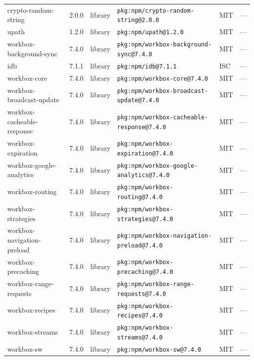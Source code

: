 \documentclass[11pt,a4paper]{article}
\begin{document}
\begin{longtable}{|p{4cm}|p{2cm}|p{1.6cm}|p{5cm}|p{1.5cm}|p{3.5cm}|}
\raggedright crypto-random-string & 2.0.0 & library & \small\texttt{pkg:npm/crypto-random-string@2.0.0} & MIT & \small — \\
\raggedright upath & 1.2.0 & library & \small\texttt{pkg:npm/upath@1.2.0} & MIT & \small — \\
\raggedright workbox-background-sync & 7.4.0 & library & \small\texttt{pkg:npm/workbox-background-sync@7.4.0} & MIT & \small — \\
\raggedright idb & 7.1.1 & library & \small\texttt{pkg:npm/idb@7.1.1} & ISC & \small — \\
\raggedright workbox-core & 7.4.0 & library & \small\texttt{pkg:npm/workbox-core@7.4.0} & MIT & \small — \\
\raggedright workbox-broadcast-update & 7.4.0 & library & \small\texttt{pkg:npm/workbox-broadcast-update@7.4.0} & MIT & \small — \\
\raggedright workbox-cacheable-response & 7.4.0 & library & \small\texttt{pkg:npm/workbox-cacheable-response@7.4.0} & MIT & \small — \\
\raggedright workbox-expiration & 7.4.0 & library & \small\texttt{pkg:npm/workbox-expiration@7.4.0} & MIT & \small — \\
\raggedright workbox-google-analytics & 7.4.0 & library & \small\texttt{pkg:npm/workbox-google-analytics@7.4.0} & MIT & \small — \\
\raggedright workbox-routing & 7.4.0 & library & \small\texttt{pkg:npm/workbox-routing@7.4.0} & MIT & \small — \\
\raggedright workbox-strategies & 7.4.0 & library & \small\texttt{pkg:npm/workbox-strategies@7.4.0} & MIT & \small — \\
\raggedright workbox-navigation-preload & 7.4.0 & library & \small\texttt{pkg:npm/workbox-navigation-preload@7.4.0} & MIT & \small — \\
\raggedright workbox-precaching & 7.4.0 & library & \small\texttt{pkg:npm/workbox-precaching@7.4.0} & MIT & \small — \\
\raggedright workbox-range-requests & 7.4.0 & library & \small\texttt{pkg:npm/workbox-range-requests@7.4.0} & MIT & \small — \\
\raggedright workbox-recipes & 7.4.0 & library & \small\texttt{pkg:npm/workbox-recipes@7.4.0} & MIT & \small — \\
\raggedright workbox-streams & 7.4.0 & library & \small\texttt{pkg:npm/workbox-streams@7.4.0} & MIT & \small — \\
\raggedright workbox-sw & 7.4.0 & library & \small\texttt{pkg:npm/workbox-sw@7.4.0} & MIT & \small — \\

\end{longtable}
\end{document}

